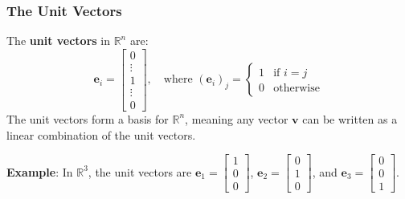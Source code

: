 \subsubsection{The Unit Vectors}
The \textbf{unit vectors} in $ \mathbb{R}^n $ are:
\begin{equation*}
    \mathbf{e}_i = \begin{bmatrix}0 \\ \vdots \\ 1 \\ \vdots \\ 0\end{bmatrix}, \quad \text{where } (\mathbf{e}_{i})_j = \begin{cases} 1 & \text{if } i = j \\ 0 & \text{otherwise} \end{cases}
\end{equation*}
The unit vectors form a basis for $ \mathbb{R}^n $, meaning any vector $ \mathbf{v} $ can be written as a linear combination of the unit vectors.
\begin{exampleBox}
    \textbf{Example}: In $ \mathbb{R}^3 $, the unit vectors are $ \mathbf{e}_1 = \begin{bmatrix}1 \\ 0 \\ 0\end{bmatrix} $, $ \mathbf{e}_2 = \begin{bmatrix}0 \\ 1 \\ 0\end{bmatrix} $, and $ \mathbf{e}_3 = \begin{bmatrix}0 \\ 0 \\ 1\end{bmatrix} $.
\end{exampleBox}

